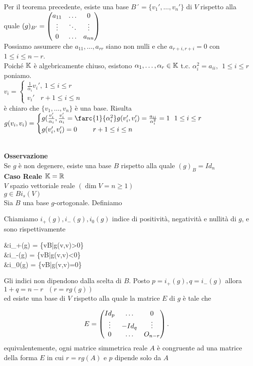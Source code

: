 \documentclass[12px]{article}
\begin{document}
	\begin{dimo}
		Per il teorema precedente, esiste una base $B´= \{v_1',\ldots,v_n'\}$ di $V$ rispetto alla quale $(g)_{B'}=\begin{pmatrix}a_{11} &\ldots&0\\
			\vdots & \ddots&\vdots\\
	0&\ldots&a_{nn}\end{pmatrix}$\\
Possiamo assumere che $a_{11},\ldots,a_{rr}$ siano non nulli e che $a_{r+i,r+i}=0$ con  $1\leq i\leq n-r$.\\
Poiché  $\mathbb{K}$ è algebricamente chiuso, esistono $\alpha_1,\ldots,\alpha_r\in\mathbb{K}$ t.c. $\alpha_i^2= a_{ii}, \ \ 1\leq i\leq r$ poniamo.\\
 $v_i = \begin{cases}
	 \frac {1}{\alpha_i}v_i', \ 1\leq i\leq r\\
	 v_i'\ \ \ \ r+1\leq i\leq n
 \end{cases}$\\
 è chiaro che $\{v_1,\ldots,v_n\}$ è una base. Risulta\\
 $g(v_i,v_i) = \begin{cases}
	 g(\frac{v_i'}{\alpha_i},\frac{v_i'}{\alpha_i} = \farc{1}{\alpha_i^2}g(v_i',v_i') = \frac{a_{ii}}{\alpha_i^2} = 1 \ \ 1\leq i \leq r\\
	 g(v_i',v_i') = 0 \ \ \ \ \ \ \ r+1\leq i\leq n
 \end{cases}$
	\end{dimo}
	\newpage \ \\ \textbf{Osservazione}\\
Se $g$ è non degenere, esiste una base  $B$ rispetto alla quale $(g)_B=Id_n$\\
 \textbf{Caso Reale $\mathbb{K}=\mathbb{R}$}\\
$V$ spazio vettoriale reale $(\dim V=n\geq 1)$\\
 $g\in Bi_s(V)$\\
 Sia $B$ una base $g$-ortogonale. Definiamo\\
 \begin{defi}
 	Chiamiamo $i_+(g),i_-(g),i_0(g)$ indice di positività, negatività e nullità di $g$, e sono rispettivamente\\
	\begin{aligend}
		&i_+(g) = \{v\in B|g(v,v)>0\}\\
		&i_-(g) = \{v\in B|g(v,v)<0\}\\
		&i_0(g) = \{v\in B|g(v,v)=0\}
	\end{aligend}
 \end{defi}
 \begin{teo}[Sylvester]
 	Gli indici non dipendono dalla scelta di $B$. Posto $p=i_+(g), q=i_-(g)$ allora $1+q=n-r\ \ \ (r=rg(g))$\\
	ed esiste una base di $V$ rispetto alla quale la matrice $E$ di $g$ è tale che 

	\[
		E = \begin{pmatrix}Id_p & \ldots & 0\\
			\vdots & -Id_q & \vdots\\
		0 & \ldots & O_{n-r}\end{pmatrix}
	.\] 
	equivalentemente, ogni matrice simmetrica reale $A$ è congruente ad una matrice della forma $E$ in cui $r = rg(A)$ e $p$ dipende solo da $A$
 \end{teo}
\end{document}
